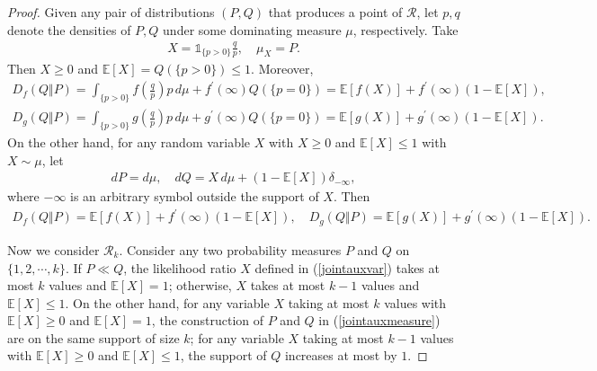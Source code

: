 \documentclass{article}
\numberwithin{equation}{section}
\newcommand{\E}{\mathbb{E}}
\renewcommand{\cal}{\mathcal}
\theoremstyle{plain}
\theoremstyle{definition}
\begin{document}
\begin{proof}
Given any pair of distributions $(P,Q)$ that produces a point of $\cal{R}$, let $p,q$ denote the densities of $P,Q$ under some dominating measure $\mu$, respectively. Take
\begin{align}
	X=\mathds{1}_{\{p>0\}}\frac{q}{p},\quad \mu_X=P.\label{jointauxvar}
\end{align}
Then $X\geq 0$ and $\E[X]=Q(\{p>0\})\leq 1$. Moreover,
\begin{align*}
	D_f(Q\Vert P) =\int_{\{p>0\}}f\left(\frac{q}{p}\right)p\,d\mu+f^\prime(\infty)Q(\{p=0\})=\E[f(X)]+f^\prime(\infty)(1-\E[X]),\\
	D_g(Q\Vert P)=\int_{\{p>0\}}g\left(\frac{q}{p}\right)p\,d\mu+g^\prime(\infty)Q(\{p=0\})=\E[g(X)]+g^\prime(\infty)(1-\E[X]).
\end{align*}
On the other hand, for any random variable $X$ with $X\geq 0$ and $\E[X]\leq 1$ with $X\sim\mu$, let
\begin{align}
	dP=d\mu,\quad dQ=X\,d\mu+(1-\E[X])\delta_{-\infty},\label{jointauxmeasure}
\end{align}
where $-\infty$ is an arbitrary symbol outside the support of $X$. Then
\begin{align*}
	D_f(Q\Vert P)=\E[f(X)]+f^\prime(\infty)(1-\E[X]),\quad D_g(Q\Vert P)=\E[g(X)]+g^\prime(\infty)(1-\E[X]).
\end{align*} 

Now we consider $\cal{R}_k$. Consider any two probability measures $P$ and $Q$ on $\{1,2,\cdots,k\}$. If $P\ll Q$, the likelihood ratio $X$ defined in (\ref{jointauxvar}) takes at most $k$ values and $\E[X]=1$; otherwise, $X$ takes at most $k-1$ values and $\E[X]\leq 1$. On the other hand, for any variable $X$ taking at most $k$ values with $\E[X]\geq 0$ and $\E[X]=1$, the construction of $P$ and $Q$ in (\ref{jointauxmeasure}) are on the same support of size $k$; for any variable $X$ taking at most $k-1$ values with $\E[X]\geq 0$ and $\E[X]\leq 1$, the support of $Q$ increases at most by $1$.
\end{proof}
\end{document}
